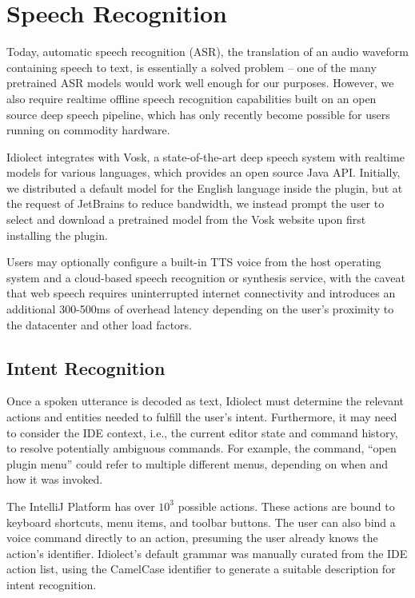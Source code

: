 \documentclass[conference]{IEEEtran}
\begin{document}
\section{Speech Recognition}

Today, automatic speech recognition (ASR), the translation of an audio waveform containing speech to text, is essentially a solved problem -- one of the many pretrained ASR models would work well enough for our purposes. However, we also require realtime offline speech recognition capabilities built on an open source deep speech pipeline, which has only recently become possible for users running on commodity hardware.

Idiolect integrates with Vosk, a state-of-the-art deep speech system with realtime models for various languages, which provides an open source Java API. Initially, we distributed a default model for the English language inside the plugin, but at the request of JetBrains to reduce bandwidth, we instead prompt the user to select and download a pretrained model from the Vosk website upon first installing the plugin.


Users may optionally configure a built-in TTS voice from the host operating system and a cloud-based speech recognition or synthesis service, with the caveat that web speech requires uninterrupted internet connectivity and introduces an additional 300-500ms of overhead latency depending on the user's proximity to the datacenter and other load factors.

\subsection{Intent Recognition}

Once a spoken utterance is decoded as text, Idiolect must determine the relevant actions and entities needed to fulfill the user's intent. Furthermore, it may need to consider the IDE context, i.e., the current editor state and command history, to resolve potentially ambiguous commands. For example, the command, ``open plugin menu'' could refer to multiple different menus, depending on when and how it was invoked.

The IntelliJ Platform has over $10^3$ possible actions. These actions are bound to keyboard shortcuts, menu items, and toolbar buttons. The user can also bind a voice command directly to an action, presuming the user already knows the action's identifier. Idiolect's default grammar was manually curated from the IDE action list, using the CamelCase identifier to generate a suitable description for intent recognition.
\end{document}
